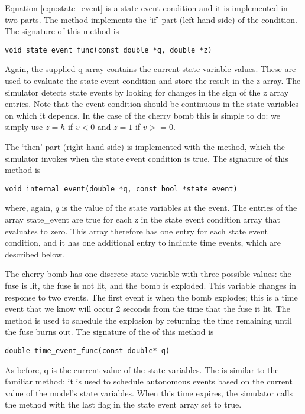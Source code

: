 Equation \ref{eqn:state_event} is a state event condition and it is implemented in two parts. The  method implements the `if' part (left hand side) of the condition. The signature of this method is
\begin{verbatim}
void state_event_func(const double *q, double *z)
\end{verbatim}
Again, the supplied q array contains the current state variable values. These are used to evaluate the state event condition and store the result in the z array. The simulator detects state events by looking for changes in the sign of the z array entries. Note that the event condition should be continuous in the state variables on which it depends. In the case of the cherry bomb this is simple to do: we simply use $z=h$ if $v < 0$ and $z=1$ if $v >= 0$.  

The `then' part (right hand side) is implemented with the  method, which the simulator invokes when the state event condition is true. The signature of this method is
\begin{verbatim}
void internal_event(double *q, const bool *state_event)
\end{verbatim}
where, again, $q$ is the value of the state variables at the event. The entries of the array state\_event are true for each z in the state event condition array that evaluates to zero. This array therefore has one entry for each state event condition, and it has one additional entry to indicate time events, which are described below.

The cherry bomb has one discrete state variable with three possible values: the fuse is lit, the fuse is not lit, and the bomb is exploded. This variable changes in response to two events. The first event is when the bomb explodes; this is a time event that we know will occur 2 seconds from the time that the fuse it lit. The  method is used to schedule the explosion by returning the time remaining until the fuse burns out. The signature of the of this method is
\begin{verbatim}
double time_event_func(const double* q)
\end{verbatim}
As before, q is the current value of the state variables. The  is similar to the familiar  method; it is used to schedule autonomous events based on the current value of the model's state variables. When this time expires, the simulator calls the  method with the last flag in the state event array set to true.

